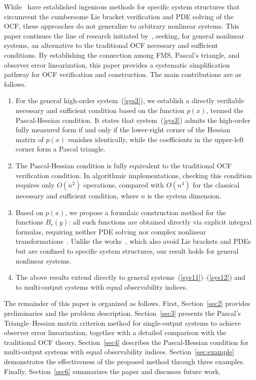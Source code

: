 \documentclass[11pt]{article}
\begin{document}
While~\cite{Xu2025Distributed,Liu2025Nonlinear} have established ingenious methods for specific system structures that circumvent the cumbersome Lie bracket verification and PDE solving of the OCF, these approaches do not generalize to arbitrary nonlinear systems. This paper continues the line of research initiated by~\cite{Xu2025Distributed}, seeking, for general nonlinear systems, an alternative to the traditional OCF necessary and sufficient conditions. By establishing the connection among FMS, Pascal's triangle, and observer error linearization, this paper provides a systematic simplification pathway for OCF verification and construction. The main contributions are as follows.

\begin{enumerate}[label=\arabic*)]
\item For the general high-order system~(\ref{sys3}), we establish a directly verifiable necessary and sufficient condition based on the function $p(x)$, termed the Pascal-Hessian condition. It states that system~(\ref{sys3}) admits the high-order fully measured form if and only if the lower-right corner of the Hessian matrix of $p(x)$ vanishes identically, while the coefficients in the upper-left corner form a Pascal triangle.

\item The Pascal-Hessian condition is fully equivalent to the traditional OCF verification condition. In algorithmic implementations, checking this condition requires only $O(n^2)$ operations, compared with $O(n^4)$ for the classical necessary and sufficient condition, where $n$ is the system dimension.

\item Based on $p(x)$, we propose a formulaic construction method for the functions $B_r(y)$: all such functions are obtained directly via explicit integral formulas, requiring neither PDE solving nor complex nonlinear transformations~\cite{Isidori1995,Boutat2021Book}. Unlike the works~\cite{Xu2025Distributed,Liu2025Nonlinear}, which also avoid Lie brackets and PDEs but are confined to specific system structures, our result holds for general nonlinear systems.

\item The above results extend directly to general systems~(\ref{sys11})--(\ref{sys12}) and to multi-output systems with equal observability indices.
\end{enumerate}

The remainder of this paper is organized as follows. First, Section~\ref{sec2} provides preliminaries and the problem description. Section~\ref{sec3} presents the Pascal's Triangle--Hessian matrix criterion method for single-output systems to achieve observer error linearization, together with a detailed comparison with the traditional OCF theory. Section~\ref{sec4} describes the Pascal-Hessian condition for multi-output systems with equal observability indices. Section~\ref{sec:example} demonstrates the effectiveness of the proposed method through three examples. Finally, Section~\ref{sec6} summarizes the paper and discusses future work.
\end{document}
